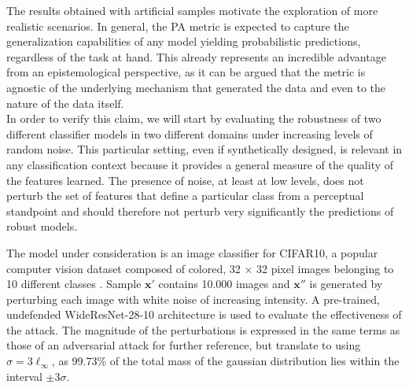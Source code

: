 The results obtained with artificial samples motivate the exploration of more realistic
scenarios. In general, the PA metric is expected to capture the generalization capabilities
of any model yielding probabilistic predictions, regardless of the task at hand. This
already represents an incredible advantage from an epistemological perspective, as it can
be argued that the metric is agnostic of the underlying mechanism that generated the data
and even to the nature of the data itself.\\

In order to verify this claim, we will start by evaluating the robustness of two
different classifier models in two different domains under increasing levels of 
random noise. This particular setting, even if synthetically designed, is 
relevant in any classification context because it provides a general measure of the 
quality of the features learned. The presence of noise, at least 
at low levels, does not perturb the set of features that define a particular class from
a perceptual standpoint and should therefore not perturb very significantly the
predictions of robust models.

\begin{experiment}
The model under consideration is an image classifier for CIFAR10, a popular
computer vision dataset composed of colored, 32 $\times$ 32 pixel images belonging to 10
different classes \cite{krizhevskyLearningMultipleLayers}. Sample
$\bm{x}'$ contains 10.000 images and $\bm{x}''$ is generated 
by perturbing each image with white noise of increasing intensity.
A pre-trained, undefended WideResNet-28-10
\cite{BMVC2016_87}
architecture is used to evaluate the effectiveness of the attack. The 
magnitude of the perturbations is expressed in the same terms as those 
of an adversarial attack for further reference, but translate to 
using $\sigma = 3 \ell_\infty$, as 99.73\% of the
total mass of the gaussian distribution lies within the 
interval $\pm 3\sigma$.
\end{experiment}

